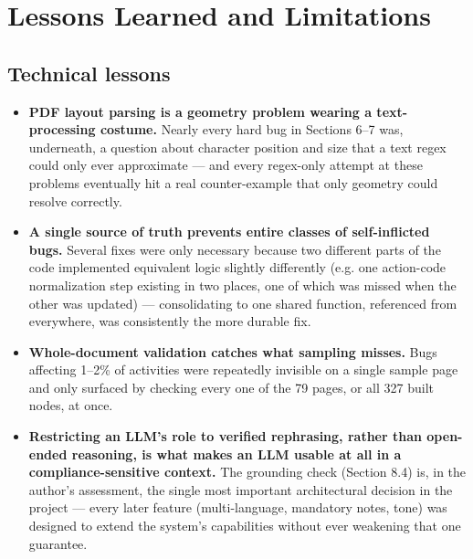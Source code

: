 \chapter{Lessons Learned and Limitations}
\label{ch:lessons-learned-and-limitations}
\section{Technical lessons}
\begin{itemize}
\item \textbf{PDF layout parsing is a geometry problem wearing a text-processing costume.} Nearly every hard bug in Sections 6–7 was, underneath, a question about character position and size that a text regex could only ever approximate — and every regex-only attempt at these problems eventually hit a real counter-example that only geometry could resolve correctly.
\item \textbf{A single source of truth prevents entire classes of self-inflicted bugs.} Several fixes were only necessary because two different parts of the code implemented equivalent logic slightly differently (e.g. one action-code normalization step existing in two places, one of which was missed when the other was updated) — consolidating to one shared function, referenced from everywhere, was consistently the more durable fix.
\item \textbf{Whole-document validation catches what sampling misses.} Bugs affecting 1–2\% of activities were repeatedly invisible on a single sample page and only surfaced by checking every one of the 79 pages, or all 327 built nodes, at once.
\item \textbf{Restricting an LLM's role to verified rephrasing, rather than open-ended reasoning, is what makes an LLM usable at all in a compliance-sensitive context.} The grounding check (Section 8.4) is, in the author's assessment, the single most important architectural decision in the project — every later feature (multi-language, mandatory notes, tone) was designed to extend the system's capabilities without ever weakening that one guarantee.
\end{itemize}
